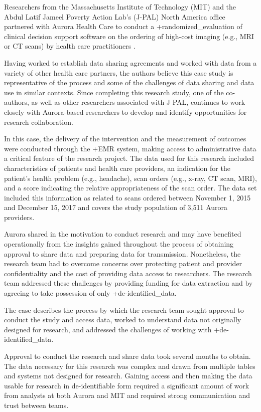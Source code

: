 \documentclass[
]{WileySix}
\begin{document}
Researchers from the Massachusetts Institute of Technology (MIT) and the Abdul Latif Jameel Poverty Action Lab's (J-PAL) North America office partnered with Aurora Health Care to conduct a +randomized\_evaluation\textbar{} of clinical decision support software on the ordering of high-cost imaging (e.g., MRI or CT scans) by health care practitioners \citep{doyle2019}.

Having worked to establish data sharing agreements and worked with data from a variety of other health care partners, the authors believe this case study is representative of the process and some of the challenges of data sharing and data use in similar contexts. Since completing this research study, one of the co-authors, as well as other researchers associated with J-PAL, continues to work closely with Aurora-based researchers to develop and identify opportunities for research collaboration.

In this case, the delivery of the intervention and the measurement of outcomes were conducted through the +EMR\textbar{} system, making access to administrative data a critical feature of the research project. The data used for this research included characteristics of patients and health care providers, an indication for the patient's health problem (e.g., headache), scan orders (e.g., x-ray, CT scan, MRI), and a score indicating the relative appropriateness of the scan order. The data set included this information as related to scans ordered between November 1, 2015 and December 15, 2017 and covers the study population of 3,511 Aurora providers.

Aurora shared in the motivation to conduct research and may have benefited operationally from the insights gained throughout the process of obtaining approval to share data and preparing data for transmission. Nonetheless, the research team had to overcome concerns over protecting patient and provider confidentiality and the cost of providing data access to researchers. The research team addressed these challenges by providing funding for data extraction and by agreeing to take possession of only +de-identified\_data\textbar.

The case describes the process by which the research team sought approval to conduct the study and access data, worked to understand data not originally designed for research, and addressed the challenges of working with +de-identified\_data\textbar.

Approval to conduct the research and share data took several months to obtain. The data necessary for this research was complex and drawn from multiple tables and systems not designed for research. Gaining access and then making the data usable for research in de-identifiable form required a significant amount of work from analysts at both Aurora and MIT and required strong communication and trust between teams.
\end{document}
